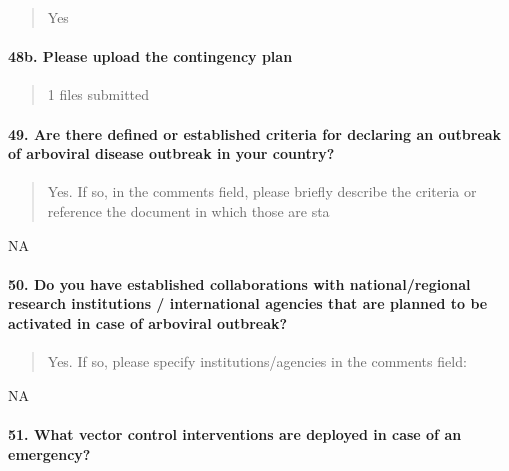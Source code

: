 \documentclass[
]{article}
\begin{document}
\begin{quote}
Yes
\end{quote}

\hypertarget{b.-please-upload-the-contingency-plan}{%
\paragraph{48b. Please upload the contingency
plan}\label{b.-please-upload-the-contingency-plan}}

\begin{quote}
1 files submitted
\end{quote}

\hypertarget{are-there-defined-or-established-criteria-for-declaring-an-outbreak-of-arboviral-disease-outbreak-in-your-country}{%
\paragraph{49. Are there defined or established criteria for declaring
an outbreak of arboviral disease outbreak in your
country?}\label{are-there-defined-or-established-criteria-for-declaring-an-outbreak-of-arboviral-disease-outbreak-in-your-country}}

\begin{quote}
Yes. If so, in the comments field, please briefly describe the criteria
or reference the document in which those are sta
\end{quote}

NA

\hypertarget{do-you-have-established-collaborations-with-nationalregional-research-institutions-international-agencies-that-are-planned-to-be-activated-in-case-of-arboviral-outbreak}{%
\paragraph{50. Do you have established collaborations with
national/regional research institutions / international agencies that
are planned to be activated in case of arboviral
outbreak?}\label{do-you-have-established-collaborations-with-nationalregional-research-institutions-international-agencies-that-are-planned-to-be-activated-in-case-of-arboviral-outbreak}}

\begin{quote}
Yes. If so, please specify institutions/agencies in the comments field:
\end{quote}

NA

\hypertarget{what-vector-control-interventions-are-deployed-in-case-of-an-emergency}{%
\paragraph{51. What vector control interventions are deployed in case of
an
emergency?}\label{what-vector-control-interventions-are-deployed-in-case-of-an-emergency}}
\end{document}
